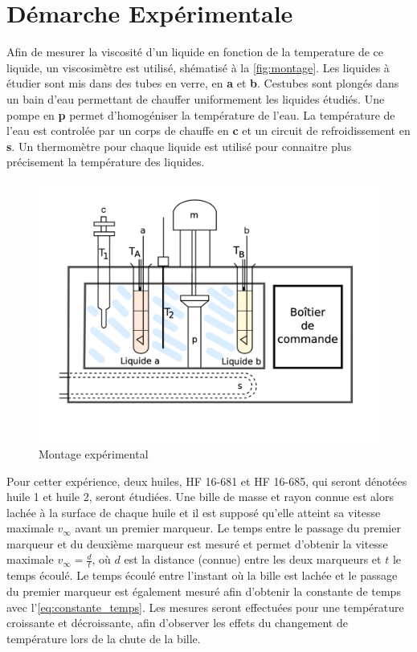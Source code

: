 \section{Démarche Expérimentale}

Afin de mesurer la viscosité d'un liquide en fonction de la temperature de ce liquide, un viscosimètre est utilisé, shématisé à la \autoref{fig:montage}. Les liquides à étudier sont mis dans des tubes en verre, en \textbf{a} et \textbf{b}. Cestubes sont plongés dans un bain d'eau permettant de chauffer uniformement les liquides étudiés. Une pompe en \textbf{p} permet d'homogéniser la température de l'eau. La température de l'eau est controlée par un corps de chauffe en \textbf{c} et un circuit de refroidissement en \textbf{s}. Un thermomètre pour chaque liquide est utilisé pour connaitre plus précisement la température des liquides.

\begin{figure}[h]
    \centering
    \includegraphics[width=0.8\linewidth]{figures/montage.png}
    \caption{Montage expérimental \cite{notice}}
    \label{fig:montage}
\end{figure}

Pour cetter expérience, deux huiles, HF 16-681 et HF 16-685, qui seront dénotées huile 1 et huile 2, seront étudiées. Une bille de masse et rayon connue est alors lachée à la surface de chaque huile et il est supposé qu'elle atteint sa vitesse maximale \(v_\infty\) avant un premier marqueur. Le temps entre le passage du premier marqueur et du deuxième marqueur est mesuré et permet d'obtenir la vitesse maximale \(v_\infty = \frac{d}{t}\), où \(d\) est la distance (connue) entre les deux marqueurs et \(t\) le temps écoulé. Le temps écoulé entre l'instant où la bille est lachée et le passage du premier marqueur est également mesuré afin d'obtenir la constante de temps avec l'\autoref{eq:constante_temps}. Les mesures seront effectuées pour une température croissante et décroissante, afin d'observer les effets du changement de température lors de la chute de la bille.
